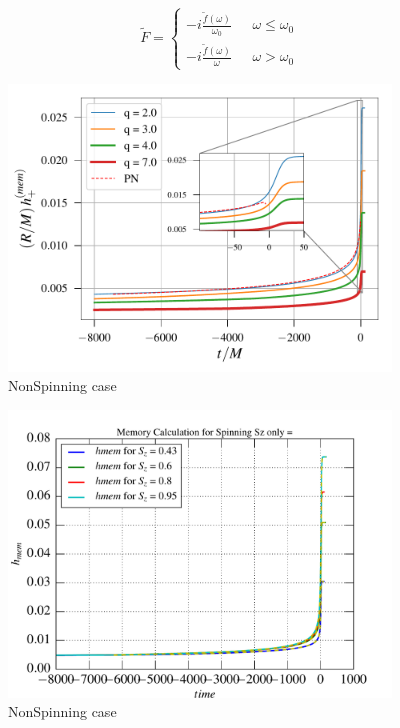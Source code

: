 \documentclass[prd,preprintnumbers,twocolumn,eqsecnum,floatfix,letter]{revtex4}
\begin{document}
\[
\tilde{F} =
\begin{cases}
-\mathit{i} \frac{\tilde{f}(\omega)}{\omega_0} & \text{ $\omega\leq\omega_0$} \\
-\mathit{i} \frac{\tilde{f}(\omega)}{\omega} & \text{ $\omega>\omega_0$} 

\end{cases}
\]
\begin{figure}
\includegraphics[width=4.0in]{../plots/MemoryPlot_nonSpining/q7.pdf}
\caption{NonSpinning case}
\label{fig:q7}
\end{figure}

\begin{figure}
\includegraphics[width=4.0in]{../plots/MemoryPlot_alignedSpin/0p95.pdf}
\caption{NonSpinning case}
\label{fig:0p95}
\end{figure}
\end{document}
